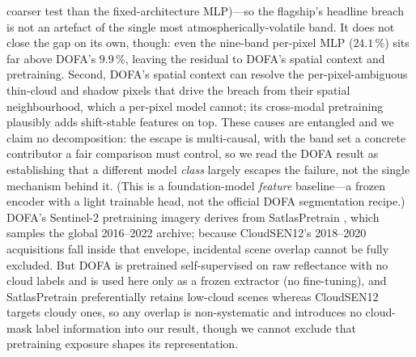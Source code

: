 \documentclass[preprint,3p,times]{elsarticle}
\begin{document}
coarser test than the fixed-architecture MLP)---so the flagship's headline breach is not an artefact of the single most atmospherically-volatile band. It does not close the gap on its own, though: even the nine-band per-pixel MLP ($24.1\,\%$) sits far above DOFA's $9.9\,\%$, leaving the residual to DOFA's spatial context and pretraining. Second, DOFA's spatial context can resolve the per-pixel-ambiguous thin-cloud and shadow pixels that drive the breach from their spatial neighbourhood, which a per-pixel model cannot; its cross-modal pretraining plausibly adds shift-stable features on top. These causes are entangled and we claim no decomposition: the escape is multi-causal, with the band set a concrete contributor a fair comparison must control, so we read the DOFA result as establishing that a different model \emph{class} largely escapes the failure, not the single mechanism behind it. (This is a foundation-model \emph{feature} baseline---a frozen encoder with a light trainable head, not the official DOFA segmentation recipe.) DOFA's Sentinel-2 pretraining imagery derives from SatlasPretrain \citep{bastani2023}, which samples the global 2016--2022 archive; because CloudSEN12's 2018--2020 acquisitions fall inside that envelope, incidental scene overlap cannot be fully excluded. But DOFA is pretrained self-supervised on raw reflectance with no cloud labels and is used here only as a frozen extractor (no fine-tuning), and SatlasPretrain preferentially retains low-cloud scenes whereas CloudSEN12 targets cloudy ones, so any overlap is non-systematic and introduces no cloud-mask label information into our result, though we cannot exclude that pretraining exposure shapes its representation.
\end{document}
